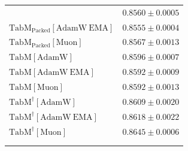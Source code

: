 \begin{longtable}{p{}p{}}
{\begin{tabular}{ll}
{\footnotesize $\mathrm{TabM_{\text{Packed}}[AdamW]}$ } & {\footnotesize$0.8560 \pm 0.0005$}\\ 
{\footnotesize $\mathrm{TabM_{\text{Packed}}[AdamW\ EMA]}$ } & {\footnotesize$0.8555 \pm 0.0004$}\\ 
{\footnotesize $\mathrm{TabM_{\text{Packed}}[Muon]}$ } & {\footnotesize$0.8567 \pm 0.0013$}\\ 
{\footnotesize $\mathrm{TabM[AdamW]}$ } & {\footnotesize$0.8596 \pm 0.0007$}\\ 
{\footnotesize $\mathrm{TabM[AdamW\ EMA]}$ } & {\footnotesize$0.8592 \pm 0.0009$}\\ 
{\footnotesize $\mathrm{TabM[Muon]}$ } & {\footnotesize$0.8592 \pm 0.0013$}\\ 
{\footnotesize $\mathrm{TabM^\dagger[AdamW]}$ } & {\footnotesize$0.8609 \pm 0.0020$}\\ 
{\footnotesize $\mathrm{TabM^\dagger[AdamW\ EMA]}$ } & {\footnotesize$0.8618 \pm 0.0022$}\\ 
{\footnotesize $\mathrm{TabM^\dagger[Muon]}$ } & {\footnotesize$0.8645 \pm 0.0006$}\\ 
\bottomrule
\end{tabular}}

\\
\topalign{
\centering
\setlength\tabcolsep{2.5pt}
\renewcommand{\arraystretch}{0.8}
\begin{tabular}{ll}


\end{tabular}}
\end{longtable}
